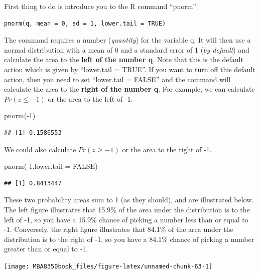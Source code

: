 \documentclass[
]{book}
\newenvironment{Shaded}{\begin{snugshade}}{\end{snugshade}}
\newcommand{\AttributeTok}[1]{\textcolor[rgb]{0.77,0.63,0.00}{#1}}
\newcommand{\ConstantTok}[1]{\textcolor[rgb]{0.00,0.00,0.00}{#1}}
\newcommand{\DecValTok}[1]{\textcolor[rgb]{0.00,0.00,0.81}{#1}}
\newcommand{\FunctionTok}[1]{\textcolor[rgb]{0.00,0.00,0.00}{#1}}
\newcommand{\NormalTok}[1]{#1}
\newcommand{\SpecialCharTok}[1]{\textcolor[rgb]{0.00,0.00,0.00}{#1}}
\begin{document}
First thing to do is introduce you to the R command ``pnorm''

\begin{verbatim}
pnorm(q, mean = 0, sd = 1, lower.tail = TRUE)
\end{verbatim}

The command requires a number (\emph{quantity}) for the variable q. It will then use a normal distribution with a mean of 0 and a standard error of 1 (\emph{by default}) and calculate the area to the \textbf{left of the number q}. Note that this is the default action which is given by ``lower.tail = TRUE''. If you want to turn off this default action, then you need to set ``lower.tail = FALSE'' and the command will calculate the area to the \textbf{right of the number q}. For example, we can calculate \(Pr(z\leq-1)\) or the area to the left of -1.

\begin{Shaded}
\begin{Highlighting}[]
\FunctionTok{pnorm}\NormalTok{(}\SpecialCharTok{{-}}\DecValTok{1}\NormalTok{)}
\end{Highlighting}
\end{Shaded}

\begin{verbatim}
## [1] 0.1586553
\end{verbatim}

We could also calculate \(Pr(z\geq-1)\) or the area to the right of -1.

\begin{Shaded}
\begin{Highlighting}[]
\FunctionTok{pnorm}\NormalTok{(}\SpecialCharTok{{-}}\DecValTok{1}\NormalTok{,}\AttributeTok{lower.tail =} \ConstantTok{FALSE}\NormalTok{)}
\end{Highlighting}
\end{Shaded}

\begin{verbatim}
## [1] 0.8413447
\end{verbatim}

These two probability areas sum to 1 (as they should), and are illustrated below. The left figure illustrates that 15.9\% of the area under the distribution is to the left of -1, so you have a 15.9\% chance of picking a number less than or equal to -1. Conversely, the right figure illustrates that 84.1\% of the area under the distribution is to the right of -1, so you have a 84.1\% chance of picking a number greater than or equal to -1.

\begin{center}\texttt{[image: MBA8350book\_files/figure-latex/unnamed-chunk-63-1]} \end{center}
\end{document}
